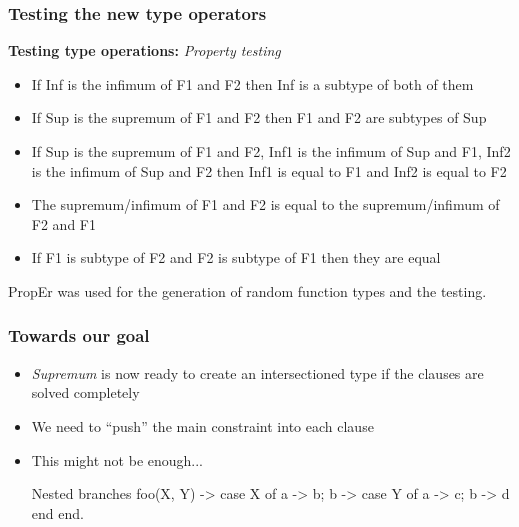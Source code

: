 \documentclass{beamer}
\begin{document}
\begin{frame}
  \frametitle{Testing the new type operators}
  \textbf{Testing type operations:} \emph{Property testing} \pause
  \begin{itemize}
  \item If Inf is the infimum of F1 and F2 then Inf is a subtype of
    both of them
  \item If Sup is the supremum of F1 and F2 then F1 and F2 are
    subtypes of Sup
  \item If Sup is the supremum of F1 and F2, Inf1 is the infimum of
    Sup and F1, Inf2 is the infimum of Sup and F2 then Inf1 is equal
    to F1 and Inf2 is equal to F2
  \item The supremum/infimum of F1 and F2 is equal to the
    supremum/infimum of F2 and F1
  \item If F1 is subtype of F2 and F2 is subtype of F1 then they are
    equal
  \end{itemize} \pause
  PropEr was used for the generation of random function types and the
  testing.
\end{frame}

\begin{frame}[fragile]
  \frametitle{Towards our goal}
  \begin{itemize}
    \item \emph{Supremum} is now ready to create an intersectioned
      type if the clauses are solved completely \pause
    \item We need to ``push'' the main constraint into each clause \pause
    \item This might not be enough...
      \begin{code}{Nested branches}
foo(X, Y) ->
  case X of
   a -> b;
   b -> case Y of
         a -> c;
         b -> d
        end
  end.
      \end{code}
  \end{itemize}
\end{frame}
\end{document}
